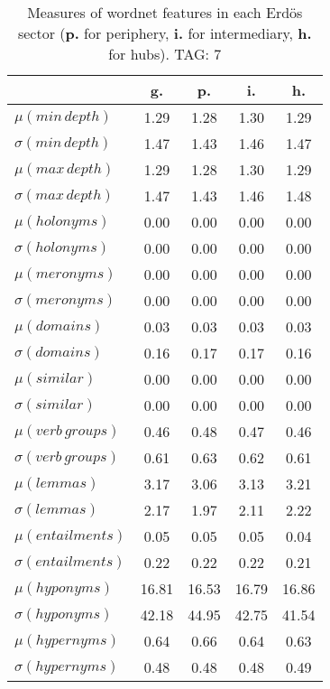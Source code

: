 \begin{table}[h!]
\begin{center}
\begin{tabular}{| l || c | c | c | c |}\hline
 & {\bf g.} & {\bf p.} & {\bf i.} & {\bf h.} \\\hline\hline
$\mu(min\,depth)$ & 1.29  & 1.28  & 1.30  & 1.29 \\
$\sigma(min\,depth)$ & 1.47  & 1.43  & 1.46  & 1.47 \\\hline
$\mu(max\,depth)$ & 1.29  & 1.28  & 1.30  & 1.29 \\
$\sigma(max\,depth)$ & 1.47  & 1.43  & 1.46  & 1.48 \\\hline
$\mu(holonyms)$ & 0.00  & 0.00  & 0.00  & 0.00 \\
$\sigma(holonyms)$ & 0.00  & 0.00  & 0.00  & 0.00 \\\hline
$\mu(meronyms)$ & 0.00  & 0.00  & 0.00  & 0.00 \\
$\sigma(meronyms)$ & 0.00  & 0.00  & 0.00  & 0.00 \\\hline
$\mu(domains)$ & 0.03  & 0.03  & 0.03  & 0.03 \\
$\sigma(domains)$ & 0.16  & 0.17  & 0.17  & 0.16 \\\hline
$\mu(similar)$ & 0.00  & 0.00  & 0.00  & 0.00 \\
$\sigma(similar)$ & 0.00  & 0.00  & 0.00  & 0.00 \\\hline
$\mu(verb\,groups)$ & 0.46  & 0.48  & 0.47  & 0.46 \\
$\sigma(verb\,groups)$ & 0.61  & 0.63  & 0.62  & 0.61 \\\hline
$\mu(lemmas)$ & 3.17  & 3.06  & 3.13  & 3.21 \\
$\sigma(lemmas)$ & 2.17  & 1.97  & 2.11  & 2.22 \\\hline
$\mu(entailments)$ & 0.05  & 0.05  & 0.05  & 0.04 \\
$\sigma(entailments)$ & 0.22  & 0.22  & 0.22  & 0.21 \\\hline
$\mu(hyponyms)$ & 16.81  & 16.53  & 16.79  & 16.86 \\
$\sigma(hyponyms)$ & 42.18  & 44.95  & 42.75  & 41.54 \\\hline
$\mu(hypernyms)$ & 0.64  & 0.66  & 0.64  & 0.63 \\
$\sigma(hypernyms)$ & 0.48  & 0.48  & 0.48  & 0.49 \\\hline
\end{tabular}
\caption{Measures of wordnet features in each Erd\"os sector ({{\bf p.}} for periphery, {{\bf i.}} for intermediary, {{\bf h.}} for hubs). TAG: 7}
\end{center}
\end{table}